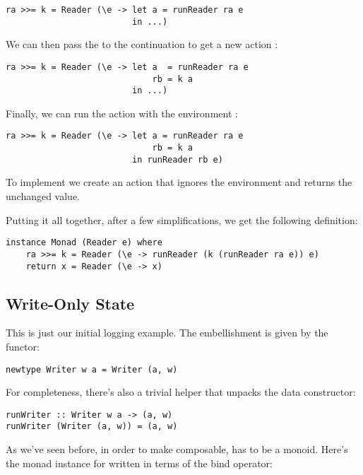 \begin{Verbatim}
ra >>= k = Reader (\e -> let a = runReader ra e
                         in ...)
\end{Verbatim}
We can then pass the  to the continuation  to get a
new action :

\begin{Verbatim}
ra >>= k = Reader (\e -> let a  = runReader ra e
                             rb = k a 
                         in ...)
\end{Verbatim}
Finally, we can run the action  with the environment
:

\begin{Verbatim}
ra >>= k = Reader (\e -> let a = runReader ra e
                             rb = k a
                         in runReader rb e)
\end{Verbatim}
To implement  we create an action that ignores the
environment and returns the unchanged value.

Putting it all together, after a few simplifications, we get the
following definition:

\begin{Verbatim}
instance Monad (Reader e) where
    ra >>= k = Reader (\e -> runReader (k (runReader ra e)) e)
    return x = Reader (\e -> x)
\end{Verbatim}

\subsection{Write-Only State}\label{write-only-state}

This is just our initial logging example. The embellishment is given by
the  functor:

\begin{Verbatim}[commandchars=\\\{\}]
newtype Writer w a = Writer (a, w)
\end{Verbatim}
For completeness, there's also a trivial helper  that
unpacks the data constructor:

\begin{Verbatim}[commandchars=\\\{\}]
runWriter :: Writer w a -> (a, w)
runWriter (Writer (a, w)) = (a, w)
\end{Verbatim}
As we've seen before, in order to make  composable,
 has to be a monoid. Here's the monad instance for
 written in terms of the bind operator:


